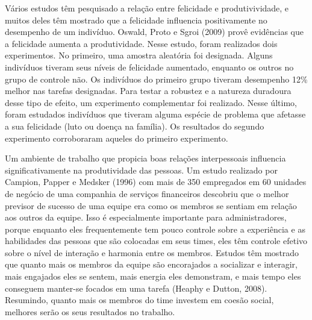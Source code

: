 Vários estudos têm pesquisado a relação entre felicidade e produtivividade, e muitos deles têm mostrado que a felicidade influencia positivamente no desempenho de um indivíduo. Oswald, Proto e Sgroi (2009) provê evidências que a felicidade aumenta a produtividade. Nesse estudo, foram realizados dois experimentos. No primeiro, uma amostra aleatória foi designada. Alguns indivíduos tiveram seus níveis de felicidade aumentado, enquanto os outros no grupo de controle não. Os indivíduos do primeiro grupo tiveram desempenho 12\% melhor nas tarefas designadas. Para testar a robustez e a natureza duradoura desse tipo de efeito, um experimento complementar foi realizado. Nesse último, foram estudados indivíduos que tiveram alguma espécie de problema que afetasse a sua felicidade (luto ou doença na família). Os resultados do segundo experimento corroboraram aqueles do primeiro experimento.


Um ambiente de trabalho que propicia boas relações interpessoais influencia significativamente na produtividade das pessoas. Um estudo realizado por Campion, Papper e Medsker (1996) com mais de 350 empregados em 60 unidades de negócio de uma companhia de serviços financeiros descobriu que o melhor previsor de sucesso de uma equipe era como os membros se sentiam em relação aos outros da equipe. Isso é especialmente importante para administradores, porque enquanto eles frequentemente tem pouco controle sobre a experiência e as habilidades das pessoas que são colocadas em seus times, eles têm controle efetivo sobre o nível de interação e harmonia entre os membros. Estudos têm mostrado que quanto mais os membros da equipe são encorajados a socializar e interagir, mais engajados eles se sentem, mais energia eles demonstram, e mais tempo eles conseguem manter-se focados em uma tarefa (Heaphy e Dutton, 2008). Resumindo, quanto mais os membros do time investem em coesão social, melhores serão os seus resultados no trabalho.




